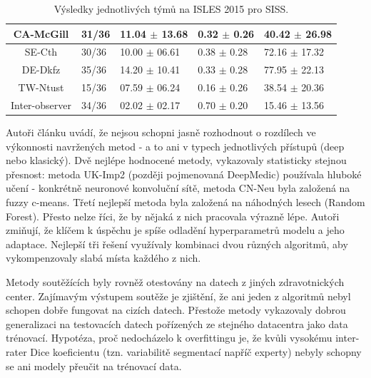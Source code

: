 \documentclass[11pt]{article}
\begin{document}
\begin{table}[htp]
\begin{tabular}{cllll}
		CA-McGill       & 31/36                              & 11.04 $\pm$ 13.68                         & 0.32 $\pm$ 0.26                              & 40.42 $\pm$ 26.98                       \\ \hline
		SE-Cth          & 30/36                              & 10.00 $\pm$ 06.61                         & 0.38 $\pm$ 0.28                              & 72.16 $\pm$ 17.32                       \\ \hline
		DE-Dkfz         & 35/36                              & 14.20 $\pm$ 10.41                         & 0.33 $\pm$ 0.28                              & 77.95 $\pm$ 22.13                       \\ \hline
		TW-Ntust        & 15/36                              & 07.59 $\pm$ 06.24                         & 0.16 $\pm$ 0.26                              & 38.54 $\pm$ 20.36                       \\ \hline
		Inter-observer  & 34/36                              & 02.02 $\pm$ 02.17                         & 0.70 $\pm$ 0.20                              & 15.46 $\pm$ 13.56                       \\ \hline
	\end{tabular}
	\caption{Výsledky jednotlivých týmů na ISLES 2015 pro SISS.}
	\label{tbl-siss_results}
\end{table}

Autoři článku uvádí, že nejsou schopni jasně rozhodnout o rozdílech ve výkonnosti navržených metod - a to ani v typech jednotlivých přístupů (deep nebo klasický). Dvě nejlépe hodnocené metody, vykazovaly statisticky stejnou přesnost: metoda UK-Imp2 (později pojmenovaná DeepMedic) používala hluboké učení - konkrétně \alert{neuronové konvoluční sítě}, metoda CN-Neu byla založená na fuzzy c-means. Třetí nejlepší metoda byla založená na náhodných lesech (\alert{Random Forest}). Přesto nelze říci, že by nějaká z nich pracovala výrazně lépe. Autoři zmiňují, že klíčem k úspěchu je spíše odladění hyperparametrů modelu a jeho adaptace. Nejlepší tři řešení využívaly kombinaci dvou různých algoritmů, aby vykompenzovaly slabá místa každého z nich.

Metody soutěžících byly rovněž otestovány na datech z jiných zdravotnických center. Zajímavým výstupem soutěže je zjištění, že ani jeden z algoritmů nebyl schopen dobře fungovat na cizích datech. Přestože metody vykazovaly dobrou generalizaci na testovacích datech pořízených ze stejného datacentra jako data trénovací. Hypotéza, proč nedocházelo k \alert{overfittingu} je, že kvůli vysokému inter-rater Dice koeficientu (tzn. variabilitě segmentací napříč experty) nebyly schopny se ani modely přeučit na trénovací data.
\end{document}
